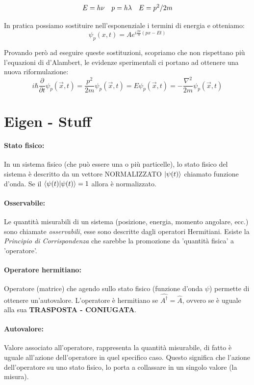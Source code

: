 $$\begin{array}{l c r}
    E = h\nu & p = h\lambda & E=p^2 / 2m
\end{array}$$

\noindent In pratica possiamo sostituire nell'esponenziale i termini di energia e otteniamo:
$$\psi_p(x, t) = Ae^{i \frac{2\pi}{h} (px - Et)}$$

\noindent Provando però ad eseguire queste sostituzioni, scopriamo che non rispettano più l'equazioni di d'Alambert, le evidenze sperimentali ci portano ad ottenere una nuova riformulazione:
$$i\hbar \frac{\partial}{\partial t}\psi_p(\vec{x}, t) = \frac{p^2}{2m}\psi_p(\vec{x}, t) = E\psi_p(\vec{x}, t) = -\frac{\nabla^2}{2m}\psi_p(\vec{x}, t)$$

\section{Eigen - Stuff}

\paragraph{Stato fisico:}
In un sistema fisico (che può essere una o più particelle), lo stato fisico del sistema è descritto da un vettore NORMALIZZATO $\ket{\psi(t)}$ chiamato funzione d'onda. Se il $\braket{\psi(t)|\psi(t)} = 1$ allora è normalizzato.

\paragraph{Osservabile:}
Le quantità misurabili di un sistema (posizione, energia, momento angolare, ecc.) sono chiamate \textit{osservabili}, esse sono descritte dagli operatori Hermitiani. Esiste la \textit{Principio di Corrispondenza} che sarebbe la promozione da 'quantità fisica' a 'operatore'.

\paragraph{Operatore hermitiano:} 
Operatore (matrice) che agendo sullo stato fisico (funzione d'onda $\psi$) permette di ottenere un'autovalore. L'operatore è hermitiano se $\hat{A^{\dagger}} = \hat{A}$, ovvero se è uguale alla sua \textbf{TRASPOSTA - CONIUGATA}.

\paragraph{Autovalore:}
Valore associato all'operatore, rappresenta la quantità misurabile, di fatto è uguale all'azione dell'operatore in quel specifico caso. Questo significa che l'azione dell'operatore su uno stato fisico, lo porta a collassare in un singolo valore (la misura).

